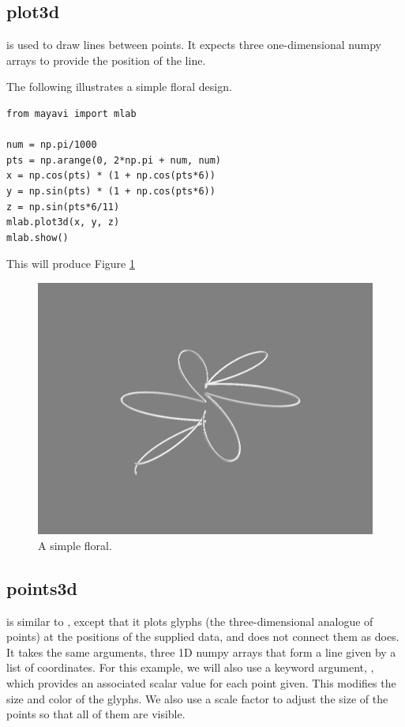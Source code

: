 \subsection*{plot3d}
 is used to draw lines between points. It expects three one-dimensional numpy 
arrays to provide the position of the line. 


The following illustrates a simple floral design.
\begin{lstlisting}
from mayavi import mlab

num = np.pi/1000
pts = np.arange(0, 2*np.pi + num, num)
x = np.cos(pts) * (1 + np.cos(pts*6))
y = np.sin(pts) * (1 + np.cos(pts*6))
z = np.sin(pts*6/11)
mlab.plot3d(x, y, z)
mlab.show()
\end{lstlisting}
This will produce Figure \ref{fig:plot3d}
\begin{figure} 
\includegraphics[width=\textwidth]{plot3d.png}
\caption{A simple floral.} 
\label{fig:plot3d}
\end{figure}


\subsection*{points3d}
 is similar to , except that it plots glyphs (the three-dimensional analogue of points) at the 
positions of the supplied data, and does not connect them as  does. It takes the same arguments, three 1D numpy arrays that form a line given by a list of  coordinates.
For this example, we will also use a keyword argument, , which provides an associated scalar 
value for each point given. This modifies the size and color of the glyphs. We also use a scale factor to adjust the size of the points so that all of them are visible.

